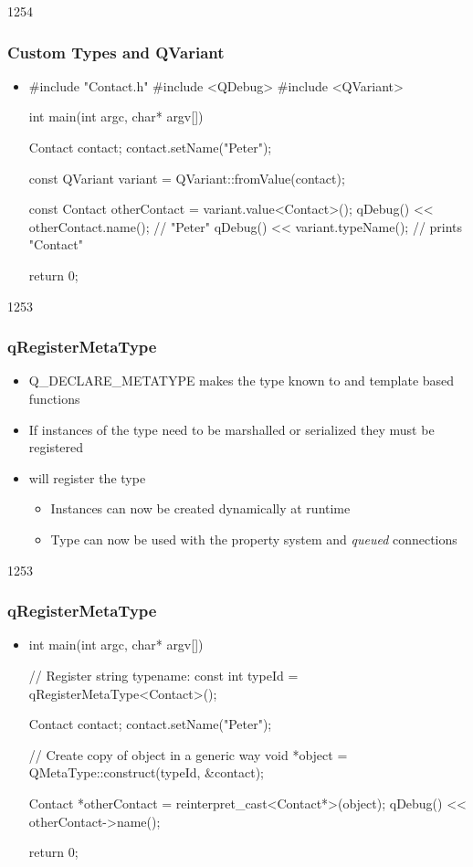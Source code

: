 \begin{slide}[fragile]{1254}
\frametitle{Custom Types and QVariant}

\begin{itemize}
\item[]
\begin{cpp}
#include "Contact.h"
#include <QDebug>
#include <QVariant>

int main(int argc, char* argv[])
{
    Contact contact;
    contact.setName("Peter");

    const QVariant variant = QVariant::fromValue(contact);

    const Contact otherContact = variant.value<Contact>();
    qDebug() << otherContact.name(); // "Peter"
    qDebug() << variant.typeName();  // prints "Contact"

    return 0;
}
\end{cpp}
\end{itemize}
\end{slide}

\begin{slide}{1253}
\frametitle{qRegisterMetaType}
\begin{itemize}
  \item Q\_DECLARE\_METATYPE makes the type known to  and template based functions
  \item If instances of the type need to be marshalled or serialized they must be registered
  \item {} will register the type
  \begin{itemize}
    \item Instances can now be created dynamically at runtime
    \item Type can now be used with the property system and \textit{queued} connections
  \end{itemize}
\end{itemize}
\end{slide}

\begin{slide}[fragile]{1253}
\frametitle{qRegisterMetaType}
\begin{itemize}
\item[]
\begin{cpp}
int main(int argc, char* argv[])
{
    // Register string typename:
    const int typeId = qRegisterMetaType<Contact>();

    Contact contact;
    contact.setName("Peter");

    // Create copy of object in a generic way
    void *object = QMetaType::construct(typeId, &contact);

    Contact *otherContact = reinterpret_cast<Contact*>(object);
    qDebug() << otherContact->name();

    return 0;
}
\end{cpp}
\end{itemize}
\end{slide}
